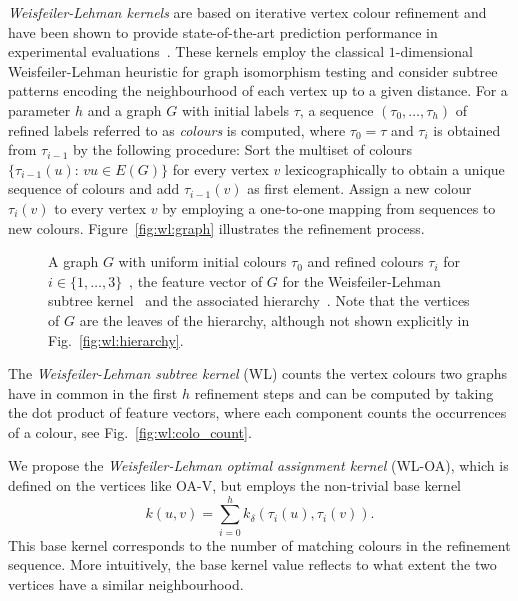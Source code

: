 \documentclass{article}
\newcommand{\lab}[0]{\tau}
\begin{document}
\emph{Weisfeiler-Lehman kernels} are based on iterative vertex colour refinement 
and have been shown to provide state-of-the-art prediction performance in 
experimental evaluations~\cite{Shervashidze2011}.
These kernels employ the classical $1$-dimensional Weisfeiler-Lehman heuristic 
for graph isomorphism testing and consider subtree patterns encoding the
neighbourhood of each vertex up to a given distance. 
For a parameter $h$ and a graph $G$ with initial labels $\lab$, a sequence 
$(\lab_0,\dots,\lab_h)$ of refined labels referred to as \emph{colours} is computed,
where $\lab_0 = \lab$ and $\lab_i$ is obtained from $\lab_{i-1}$ by the following 
procedure:
Sort the multiset of colours $\{\lab_{i-1}(u) :\, vu \in E(G)\}$ for every 
vertex $v$ lexicographically to obtain a unique sequence of colours and add 
$\lab_{i-1}(v)$ as first element. Assign a new colour $\lab_i(v)$ to every vertex 
$v$ by employing a one-to-one mapping from sequences to new colours. 
Figure~\ref{fig:wl:graph} illustrates the refinement process.
\begin{figure}
  \centering
  \null\hfill
  \hfill
  \hfill
  \hfill\null
  \caption{
    A graph $G$ with uniform initial colours $\lab_0$ and refined colours 
    $\lab_i$ for $i \in \{1,\dots,3\}$~, 
    the feature vector of $G$ for the Weisfeiler-Lehman subtree kernel~
    and the associated hierarchy~.
    Note that the vertices of $G$ are the leaves of the hierarchy, although
    not shown explicitly in Fig.~\ref{fig:wl:hierarchy}.
  }
  \label{fig:wl}
\end{figure}
The \emph{Weisfeiler-Lehman subtree kernel} (WL) 
counts the vertex colours two graphs have in common in the first $h$ refinement 
steps and can be computed by taking the dot product of feature vectors, where 
each component counts the occurrences of a colour, see Fig.~\ref{fig:wl:colo_count}.

We propose the \emph{Weisfeiler-Lehman optimal assignment kernel} (WL-OA),
which is defined on the vertices like OA-V, but employs the non-trivial base kernel 
\begin{equation}\label{eq:strong:wl}
  k(u,v) = \sum_{i=0}^h k_\delta(\lab_i(u), \lab_i(v)).
\end{equation}
This base kernel corresponds to the number of matching colours in the refinement 
sequence.
More intuitively, the base kernel value reflects to what extent the two vertices 
have a similar neighbourhood.
\end{document}
